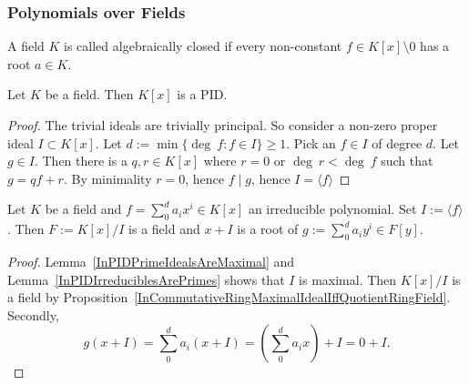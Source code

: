 \subsubsection{Polynomials over Fields}
\begin{definition}
    A field $K$ is called algebraically closed if every non-constant $f\in K[x]\setminus 0$ has a root $a\in K$. 
\end{definition}
\begin{lemma}
    Let $K$ be a field. Then $K[x]$ is a PID. 
\end{lemma}
\begin{proof}
    The trivial ideals are trivially principal. So consider a non-zero proper ideal $I\subset K[x]$. Let $d:= \min \{\deg \ f: f\in I\} \geq 1$. Pick an $f\in I$ of degree $d$. Let $g\in I$. Then there is a $q,r\in K[x]$ where $r = 0$ or $\deg \ r <\deg \ f$ such that $g=qf+r$. By minimality $r=0$, hence $f\mid g$, hence $I=\langle f\rangle$ 
\end{proof}
\begin{lemma}\label{OverFieldQoutientRingWithRespectToIrreduciblePolynomialIsAField}
    Let $K$ be a field and $f=\sum_0^d a_ix^i\in K[x]$ an irreducible polynomial. Set $I:=\langle f\rangle$. Then $F:=K[x]/I$ is a field and $x+I$ is a root of $g:= \sum_0^d a_iy^i\in F[y]$.
\end{lemma}
\begin{proof}
    Lemma~\ref{InPIDPrimeIdealsAreMaximal} and Lemma~\ref{InPIDIrreduciblesArePrimes} shows that $I$ is maximal. Then $K[x]/I$ is a field by Proposition~\ref{InCommutativeRingMaximalIdealIffQuotientRingField}. Secondly, 
    $$g(x+I)=\sum_0^d a_i(x+I)=\left(\sum_0^d a_ix\right)+I=0+I.$$
\end{proof}
